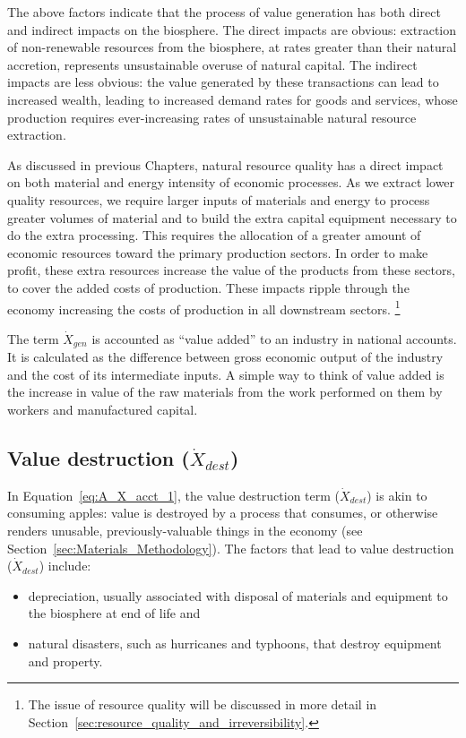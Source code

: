 The above factors indicate that the process of value generation
has both direct and indirect impacts on the biosphere.
The direct impacts are obvious: 
extraction of non-renewable resources from the biosphere, 
at rates greater than their natural accretion,
represents unsustainable overuse of natural capital.
The indirect impacts are less obvious: 
the value generated by these transactions can lead to increased wealth,
leading to increased demand rates for goods and services, 
whose production requires ever-increasing rates 
of unsustainable natural resource extraction.

As discussed in previous Chapters,
natural resource quality has a direct impact on both
material and energy intensity of economic processes.
As we extract lower quality resources, we require
larger inputs of materials and energy
to process greater volumes of material
and to build the extra capital equipment
necessary to do the extra processing.
This requires the allocation of a greater amount
of economic resources toward the primary production sectors.
In order to make profit,
these extra resources increase the value of the products
from these sectors,
to cover the added costs of production.
These impacts ripple through the economy 
increasing the costs of production in all downstream sectors.%
	\footnote{
	The issue 
	of resource quality will be discussed in more
	detail in Section~\ref{sec:resource_quality_and_irreversibility}.
	}

The term $\dot{X}_{gen}$ is accounted as ``value added'' to an industry in national accounts.
It is calculated as the difference between gross economic output of the industry
and the cost of its intermediate inputs.\cite{BEAVA}  
A simple way to think of value added is
the increase in value of the raw materials from the work performed 
on them by workers and manufactured capital.


\subsection[Value destruction]{Value destruction ($\dot{X}_{dest}$)}

\noindent In Equation~\ref{eq:A_X_acct_1}, 
the value destruction term ($\dot{X}_{dest}$)
is akin to consuming apples: 
value is destroyed by a process that consumes, 
or otherwise renders unusable, 
previously-valuable things in the economy
(see Section~\ref{sec:Materials_Methodology}).
The factors that lead to value destruction
($\dot{X}_{dest}$) include:
%
\begin{itemize}
	\item{depreciation, usually associated with disposal of 
	materials and equipment to the biosphere at end of life and}
	\item{natural disasters, such as hurricanes and typhoons,
	that destroy equipment and property.}
\end{itemize}


